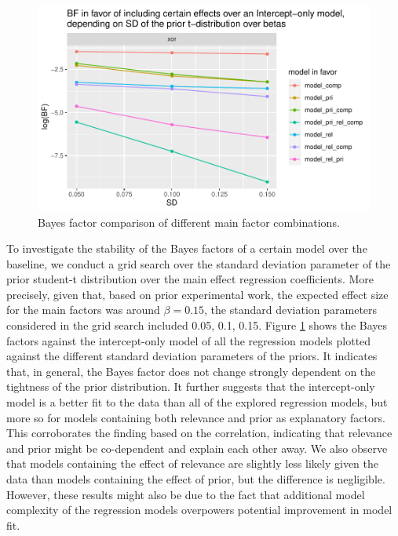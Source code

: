 \documentclass{sp}
\begin{document}
\begin{figure}[h]
	\begin{center}
		\includegraphics[width=0.8\linewidth]{images/BF_vs_SD_allModels_vs_int.pdf}
	\end{center}
	\vspace{-0.3cm}
	\caption{Bayes factor comparison of different main factor combinations.}
	\label{bf-grid-search}
\end{figure}

To investigate the stability of the Bayes factors of a certain model over the baseline, we conduct a grid search over the standard deviation parameter of the prior student-t distribution over the main effect regression coefficients. More precisely, given that, based on prior experimental work, the expected effect size for the main factors was around $\beta=0.15$, the standard deviation parameters considered in the grid search included {0.05, 0.1, 0.15}. Figure \ref{bf-grid-search} shows the Bayes factors against the intercept-only model of all the regression models plotted against the different standard deviation parameters of the priors. It indicates that, in general, the Bayes factor does not change strongly dependent on the tightness of the prior distribution. It further suggests that the intercept-only model is a better fit to the data than all of the explored regression models, but more so for models containing both relevance and prior as explanatory factors. This corroborates the finding based on the correlation, indicating that relevance and prior might be co-dependent and explain each other away. We also observe that models containing the effect of relevance are slightly less likely given the data than models containing the effect of prior, but the difference is negligible. However, these results might also be due to the fact that additional model complexity of the regression models overpowers potential improvement in model fit.
\end{document}
